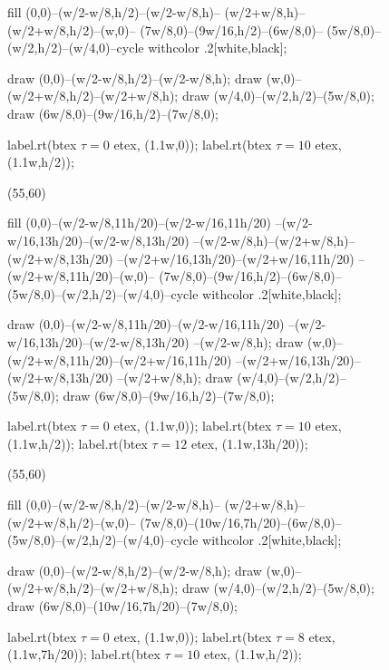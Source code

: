 \documentclass{manual}
\begin{document}
\begin{empfile}
\begin{figure}[tb]
\begin{empdef}
    fill (0,0)--(w/2-w/8,h/2)--(w/2-w/8,h)--
         (w/2+w/8,h)--(w/2+w/8,h/2)--(w,0)--
         (7w/8,0)--(9w/16,h/2)--(6w/8,0)--
         (5w/8,0)--(w/2,h/2)--(w/4,0)--cycle
         withcolor .2[white,black];

    draw (0,0)--(w/2-w/8,h/2)--(w/2-w/8,h);
    draw (w,0)--(w/2+w/8,h/2)--(w/2+w/8,h);
    draw (w/4,0)--(w/2,h/2)--(5w/8,0);
    draw (6w/8,0)--(9w/16,h/2)--(7w/8,0);

    label.rt(btex $\tau=0$ etex, (1.1w,0));
    label.rt(btex $\tau=10$ etex, (1.1w,h/2));
  \end{empdef}
  \begin{empdef}(55,60)

    fill  (0,0)--(w/2-w/8,11h/20)--(w/2-w/16,11h/20)
         --(w/2-w/16,13h/20)--(w/2-w/8,13h/20)
         --(w/2-w/8,h)--(w/2+w/8,h)--(w/2+w/8,13h/20)
         --(w/2+w/16,13h/20)--(w/2+w/16,11h/20)
         --(w/2+w/8,11h/20)--(w,0)--
         (7w/8,0)--(9w/16,h/2)--(6w/8,0)--
         (5w/8,0)--(w/2,h/2)--(w/4,0)--cycle
         withcolor .2[white,black];

    draw (0,0)--(w/2-w/8,11h/20)--(w/2-w/16,11h/20)
         --(w/2-w/16,13h/20)--(w/2-w/8,13h/20)
         --(w/2-w/8,h);
    draw (w,0)--(w/2+w/8,11h/20)--(w/2+w/16,11h/20)
         --(w/2+w/16,13h/20)--(w/2+w/8,13h/20)
         --(w/2+w/8,h);
    draw (w/4,0)--(w/2,h/2)--(5w/8,0);
    draw (6w/8,0)--(9w/16,h/2)--(7w/8,0);

    label.rt(btex $\tau=0$ etex, (1.1w,0));
    label.rt(btex $\tau=10$ etex, (1.1w,h/2));
    label.rt(btex $\tau=12$ etex, (1.1w,13h/20));
  \end{empdef}
  \begin{empdef}(55,60)

    fill (0,0)--(w/2-w/8,h/2)--(w/2-w/8,h)--
         (w/2+w/8,h)--(w/2+w/8,h/2)--(w,0)--
         (7w/8,0)--(10w/16,7h/20)--(6w/8,0)--
         (5w/8,0)--(w/2,h/2)--(w/4,0)--cycle
         withcolor .2[white,black];

    draw (0,0)--(w/2-w/8,h/2)--(w/2-w/8,h);
    draw (w,0)--(w/2+w/8,h/2)--(w/2+w/8,h);
    draw (w/4,0)--(w/2,h/2)--(5w/8,0);
    draw (6w/8,0)--(10w/16,7h/20)--(7w/8,0);

    label.rt(btex $\tau=0$ etex, (1.1w,0));
    label.rt(btex $\tau=8$ etex, (1.1w,7h/20));
    label.rt(btex $\tau=10$ etex, (1.1w,h/2));
  \end{empdef}


\end{figure}
\end{empfile}
\end{document}
